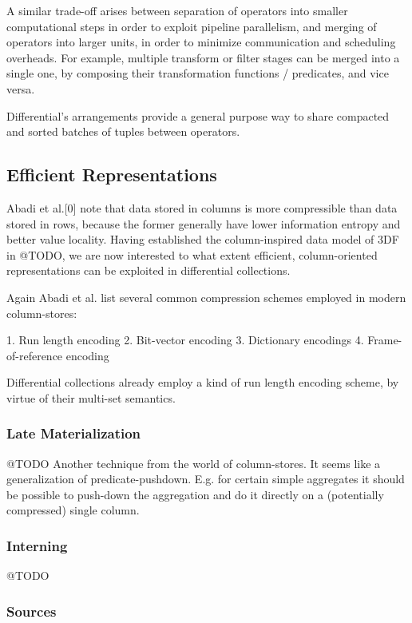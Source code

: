 \documentclass[../index.tex]{subfiles}
\begin{document}
A similar trade-off arises between separation of operators into
smaller computational steps in order to exploit pipeline parallelism,
and merging of operators into larger units, in order to minimize
communication and scheduling overheads. For example, multiple
transform or filter stages can be merged into a single one, by
composing their transformation functions / predicates, and vice versa.

Differential's arrangements provide a general purpose way to share
compacted and sorted batches of tuples between operators.

\subsection{Efficient Representations}

Abadi et al.[0] note that data stored in columns is more compressible
than data stored in rows, because the former generally have lower
information entropy and better value locality. Having established the
column-inspired data model of 3DF in @TODO, we are now interested to
what extent efficient, column-oriented representations can be
exploited in differential collections.

Again Abadi et al. list several common compression schemes employed in
modern column-stores:

1. Run length encoding
2. Bit-vector encoding
3. Dictionary encodings
4. Frame-of-reference encoding

Differential collections already employ a kind of run length encoding
scheme, by virtue of their multi-set semantics.

\subsubsection{Late Materialization}

@TODO
Another technique from the world of column-stores. It seems like a
generalization of predicate-pushdown. E.g. for certain simple
aggregates it should be possible to push-down the aggregation and do
it directly on a (potentially compressed) single column.

\subsubsection{Interning}

@TODO

\subsubsection{Sources}
\end{document}
